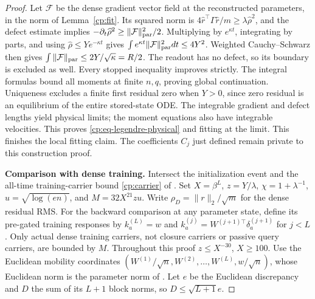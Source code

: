 \begin{proof}
Let $\mathcal F$ be the dense gradient vector field at the reconstructed
parameters, in the norm of Lemma~\ref{cp:fit}.  Its squared norm is
$4\widehat r^\top\Gamma\widehat r/m\ge\lambda\widehat\rho^2$,
and the defect estimate implies
$-\partial_t\widehat\rho^2\ge\|\mathcal F\|_{\rm par}^2/2$.
Multiplying by $e^{\kappa t}$, integrating by parts, and using
$\widehat\rho\le Ye^{-\kappa t}$ gives
$\int e^{\kappa t}\|\mathcal F\|_{\rm par}^2dt\le4Y^2$.
Weighted Cauchy--Schwarz then gives
$\int\|\mathcal F\|_{\rm par}\le2Y/\sqrt\kappa=R/2$.
The readout has no defect, so its boundary is excluded as well.
Every stopped inequality improves strictly.  The integral formulas
bound all moments at finite $n,q$, proving global continuation.
Uniqueness excludes a finite first residual zero when $Y>0$, since
zero residual is an equilibrium of the entire stored-state ODE.
The integrable gradient and defect lengths yield physical limits;
the moment equations also have integrable velocities.  This proves
\eqref{cp:eq-legendre-physical} and fitting at the limit.
This finishes the local fitting claim. The coefficients $C_j$
just defined remain private to this construction proof.

\noindent\textbf{Comparison with dense training.}\quad
Intersect the initialization event and the all-time training-carrier
bound \eqref{cp:carrier} of . Set
$X=\beta^L$, $z=Y/\lambda$, $\chi=1+\lambda^{-1}$,
$u=\sqrt{\log(en)}$, and $M=32X^{21}zu$.
Write $\rho_D=\|r\|_2/\sqrt m$ for the dense residual RMS.
For the backward comparison at any parameter state, define its pre-gated
training responses by $k_a^{(L)}=w$ and
$k_a^{(j)}=W^{(j+1)\top}\delta_a^{(j+1)}$ for $j<L$.
Only actual dense training carriers, not closure carriers or passive
query carriers, are bounded by $M$.  Throughout this proof
$z\le X^{-30}$, $X\ge100$. Use the Euclidean mobility coordinates
$(W^{(1)}/\sqrt n,W^{(2)},\ldots,W^{(L)},w/\sqrt n)$,
whose Euclidean norm is the parameter norm of .
Let $e$ be the Euclidean discrepancy and $D$ the
sum of its $L+1$ block norms, so $D\le\sqrt{L+1}e$.


\end{proof}
